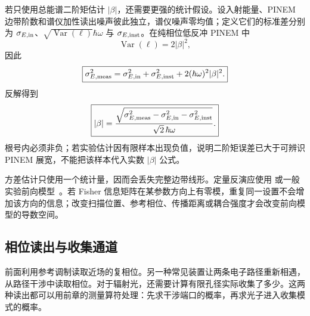 若只使用总能谱二阶矩估计 $|\beta|$，还需要更强的统计假设。设入射能量、PINEM 边带阶数和谱仪加性读出噪声彼此独立，谱仪噪声零均值；定义它们的标准差分别为 $\sigma_{E,{\rm in}}$、$\sqrt{\operatorname{Var}(\ell)}\hbar\omega$ 与 $\sigma_{E,{\rm inst}}$。在纯相位低反冲 PINEM 中
\begin{equation*}
\operatorname{Var}(\ell)=2|\beta|^2,
\end{equation*}
因此
\begin{equation}
\boxed{
\sigma_{E,{\rm meas}}^2
=\sigma_{E,{\rm in}}^2
+\sigma_{E,{\rm inst}}^2
+2(\hbar\omega)^2|\beta|^2.}
\label{eq:pinem_energy_variance_addition}
\end{equation}
反解得到
\begin{equation}
\boxed{
|\beta|
=
\frac{\sqrt{
\sigma_{E,{\rm meas}}^2
-\sigma_{E,{\rm in}}^2
-\sigma_{E,{\rm inst}}^2}}
{\sqrt2\,\hbar\omega}.}
\label{eq:beta_from_variance_experiment}
\end{equation}
根号内必须非负；若实验估计因有限样本出现负值，说明二阶矩误差已大于可辨识 PINEM 展宽，不能把该样本代入实数 $|\beta|$ 公式。

方差估计只使用一个统计量，因而会丢失完整边带线形。定量反演应使用 或一般实验前向模型~。若 Fisher 信息矩阵在某参数方向上有零模，重复同一设置不会增加该方向的信息；改变扫描位置、参考相位、传播距离或耦合强度才会改变前向模型的导数空间。



\subsection{相位读出与收集通道}\label{subsec:phase-collection-dp19}

前面利用参考调制读取近场的复相位。另一种常见装置让两条电子路径重新相遇，从路径干涉中读取相位。对于辐射光，还需要计算有限孔径实际收集了多少。这两种读出都可以用前章的测量算符处理：先求干涉端口的概率，再求光子进入收集模式的概率。

